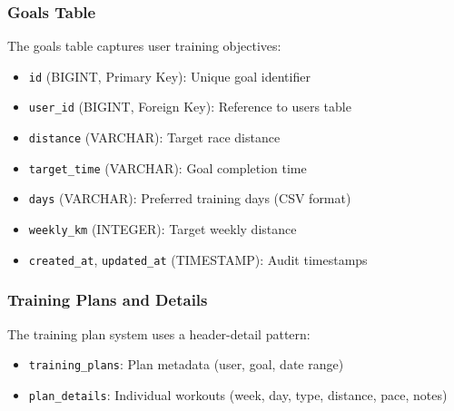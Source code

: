 \subsubsection{Goals Table}
The goals table captures user training objectives:
\begin{itemize}
    \item \texttt{id} (BIGINT, Primary Key): Unique goal identifier
    \item \texttt{user\_id} (BIGINT, Foreign Key): Reference to users table
    \item \texttt{distance} (VARCHAR): Target race distance
    \item \texttt{target\_time} (VARCHAR): Goal completion time
    \item \texttt{days} (VARCHAR): Preferred training days (CSV format)
    \item \texttt{weekly\_km} (INTEGER): Target weekly distance
    \item \texttt{created\_at}, \texttt{updated\_at} (TIMESTAMP): Audit timestamps
\end{itemize}

\subsubsection{Training Plans and Details}
The training plan system uses a header-detail pattern:
\begin{itemize}
    \item \texttt{training\_plans}: Plan metadata (user, goal, date range)
    \item \texttt{plan\_details}: Individual workouts (week, day, type, distance, pace, notes)
\end{itemize}


